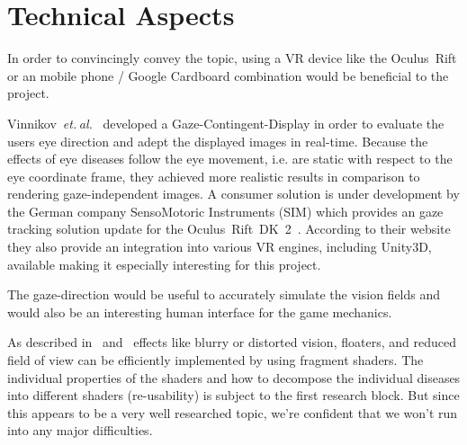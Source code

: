 \documentclass{acm_proc_article-sp}
\newcommand{\etal}{\textit{et. al.}}
\begin{document}
\section{Technical Aspects}
In order to convincingly convey the topic, using a VR device like the
Oculus Rift or an mobile phone / Google Cardboard combination would
be beneficial to the project.

Vinnikov \etal \cite{gazedisplays} developed a Gaze-Contingent-Display in order
to evaluate the users eye direction and adept the displayed images in real-time.
Because the effects of eye diseases follow the eye movement, i.e. are static
with respect to the eye coordinate frame, they achieved more realistic results
in comparison to rendering gaze-independent images.
A consumer solution is under development by the German company
SensoMotoric Instruments (SIM) which provides an gaze tracking solution update
for the Oculus Rift DK 2 \cite{smi-oculus, arstechoculus}.
According to their website they also provide an integration into various VR
engines, including Unity3D, available making it especially interesting for
this project.

The gaze-direction would be useful to accurately simulate the vision fields
and would also be an interesting human interface for the game mechanics.

As described in \cite{gazedisplays} and \cite{eyediseasesim} effects like
blurry or distorted vision, floaters, and reduced field of view can be
efficiently implemented by using fragment shaders. The individual properties
of the shaders and how to decompose the individual diseases into different
shaders (re-usability) is subject to the first research block. But since this
appears to be a very well researched topic, we're confident that we won't run
into any major difficulties.
\end{document}
